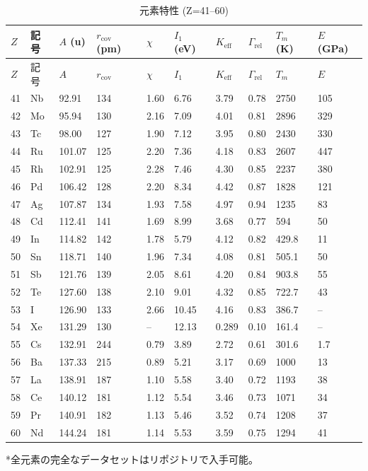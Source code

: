 \documentclass[11pt,a4paper]{article}
\newcommand{\Keff}{K_{\mathrm{eff}}}
\theoremstyle{remark}
\begin{document}
	\begin{longtable}{p{0.6cm}p{1.2cm}p{1.2cm}p{1.2cm}p{1.2cm}p{1.2cm}p{1.5cm}p{1.2cm}p{1.2cm}p{1.2cm}}
		\caption{元素特性 (Z=41–60)} \label{tab:elem-data-41to60} \\
		\toprule
		\(Z\) & 記号 & \(A\) (u) & \(r_{\text{cov}}\) (pm) & \(\chi\) & \(I_1\) (eV) & \(\Keff\) & \(\Gamma_{\text{rel}}\) & \(T_m\) (K) & \(E\) (GPa) \\
		\midrule
		\endfirsthead
		\toprule
		\(Z\) & 記号 & \(A\) & \(r_{\text{cov}}\) & \(\chi\) & \(I_1\) & \(\Keff\) & \(\Gamma_{\text{rel}}\) & \(T_m\) & \(E\) \\
		\midrule
		\endhead
		41 & Nb & 92.91 & 134 & 1.60 & 6.76 & 3.79 & 0.78 & 2750 & 105 \\
		42 & Mo & 95.94 & 130 & 2.16 & 7.09 & 4.01 & 0.81 & 2896 & 329 \\
		43 & Tc & 98.00 & 127 & 1.90 & 7.12 & 3.95 & 0.80 & 2430 & 330 \\
		44 & Ru & 101.07 & 125 & 2.20 & 7.36 & 4.18 & 0.83 & 2607 & 447 \\
		45 & Rh & 102.91 & 125 & 2.28 & 7.46 & 4.30 & 0.85 & 2237 & 380 \\
		46 & Pd & 106.42 & 128 & 2.20 & 8.34 & 4.42 & 0.87 & 1828 & 121 \\
		47 & Ag & 107.87 & 134 & 1.93 & 7.58 & 4.97 & 0.94 & 1235 & 83 \\
		48 & Cd & 112.41 & 141 & 1.69 & 8.99 & 3.68 & 0.77 & 594 & 50 \\
		49 & In & 114.82 & 142 & 1.78 & 5.79 & 4.12 & 0.82 & 429.8 & 11 \\
		50 & Sn & 118.71 & 140 & 1.96 & 7.34 & 4.08 & 0.81 & 505.1 & 50 \\
		51 & Sb & 121.76 & 139 & 2.05 & 8.61 & 4.20 & 0.84 & 903.8 & 55 \\
		52 & Te & 127.60 & 138 & 2.10 & 9.01 & 4.32 & 0.85 & 722.7 & 43 \\
		53 & I  & 126.90 & 133 & 2.66 & 10.45 & 4.16 & 0.83 & 386.7 & – \\
		54 & Xe & 131.29 & 130 & –    & 12.13 & 0.289 & 0.10 & 161.4 & – \\
		55 & Cs & 132.91 & 244 & 0.79 & 3.89 & 2.72 & 0.61 & 301.6 & 1.7 \\
		56 & Ba & 137.33 & 215 & 0.89 & 5.21 & 3.17 & 0.69 & 1000 & 13 \\
		57 & La & 138.91 & 187 & 1.10 & 5.58 & 3.40 & 0.72 & 1193 & 38 \\
		58 & Ce & 140.12 & 181 & 1.12 & 5.54 & 3.46 & 0.73 & 1071 & 34 \\
		59 & Pr & 140.91 & 182 & 1.13 & 5.46 & 3.52 & 0.74 & 1208 & 37 \\
		60 & Nd & 144.24 & 181 & 1.14 & 5.53 & 3.59 & 0.75 & 1294 & 41 \\
		\bottomrule
	\end{longtable}
	*全元素の完全なデータセットはリポジトリで入手可能。
	
\end{document}
